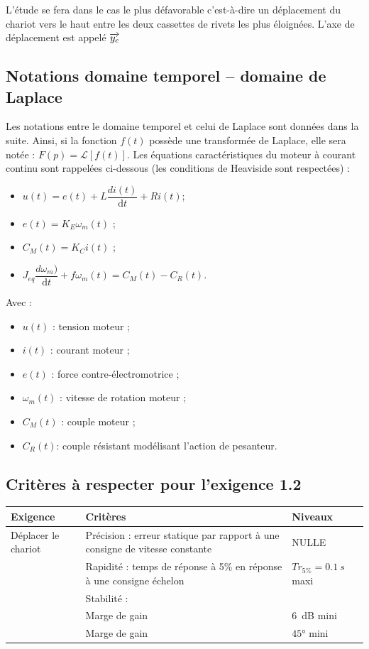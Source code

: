 \documentclass[10pt,fleqn]{article} %
\begin{document}
L’étude se fera dans le cas le plus défavorable c'est-à-dire un déplacement du chariot vers le haut entre les deux cassettes de rivets les plus éloignées. L’axe de déplacement est appelé $\overrightarrow{y_c}$
\subsection*{Notations domaine temporel – domaine de Laplace}

Les notations entre le domaine temporel et celui de Laplace sont données dans la suite. Ainsi, si la fonction $f(t)$ possède une transformée de Laplace, elle sera notée : $F(p) = \mathcal{L}[f(t)]$.
Les équations caractéristiques du moteur à courant continu sont rappelées ci-dessous (les conditions de Heaviside sont respectées) :
\begin{itemize}[label=,font=\color{ocre}] 
\item $u(t)=e(t)+L \dfrac{di(t)}{\text{d} t}+Ri(t)$;
\item $e(t)=K_E \omega_m (t)$ ;
\item $C_M (t)=K_C i(t)$ ;
\item $J_{eq}  \dfrac{d\omega_m)}{\text{d} t}+f\omega_m (t)=C_M (t)-C_R (t)$.
\end{itemize}

Avec : 
\begin{itemize}[label=,font=\color{ocre}] 
\item $u(t)$ : tension moteur ;
\item $i(t)$ : courant moteur ; 
\item $e(t)$ : force contre-électromotrice ;
\item $\omega_m(t)$ : vitesse de rotation moteur ;
\item $C_M (t)$ : couple moteur ;
\item $C_R (t)$: couple résistant modélisant l’action de pesanteur.
\end{itemize}

\subsection*{Critères à respecter pour l’exigence 1.2}

\footnotesize{\begin{center}
\begin{tabular}{|p{2.5cm}|p{2.5cm}|p{2.5cm}|}
\hline
Exigence	& Critères & Niveaux \\ \hline
Déplacer le chariot	& Précision :
erreur statique par rapport à une consigne de vitesse constante	
& NULLE \\ \hline
	& Rapidité : temps de réponse à 5\% en réponse à une consigne échelon 
	& $Tr_{5\%} = \SI{0,1}{s}$  maxi \\ \hline
	& Stabilité : & \\
	& Marge de gain & \SI{6}{dB} mini \\
	&Marge de gain & $\ang{45}$ mini \\
\hline
\end{tabular}
\end{center}}
\end{document}
